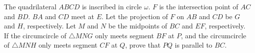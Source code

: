 The quadrilateral $ABCD$ is inscribed in circle $\omega$. $F$ is the intersection point of $AC$ and $BD$. $BA$ and $CD$ meet at $E$. Let the projection of $F$ on $AB$ and $CD$ be $G$ and $H$,  respectively. Let $M$ and $N$ be the midpoints of $BC$ and $EF$,  respectively. If the circumcircle of $\triangle MNG$ only meets segment $BF$ at $P$,  and the circumcircle of $\triangle MNH$ only meets segment $CF$ at $Q$,  prove that $PQ$ is parallel to $BC$.